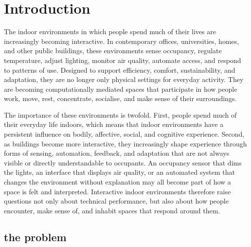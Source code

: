 \chapter{Introduction}\label{ch:introduction}


\openingpara
  {The indoor environments in which people spend much of their lives}
  {are increasingly becoming interactive. In contemporary offices, universities, homes, and other public buildings, these environments sense occupancy, regulate temperature, adjust lighting, monitor air quality, automate access, and respond to patterns of use. Designed to support efficiency, comfort, sustainability, and adaptation, they are no longer only physical settings for everyday activity. They are becoming computationally mediated spaces that participate in how people work, move, rest, concentrate, socialise, and make sense of their surroundings.}

The importance of these environments is twofold. First, people spend much of their everyday life indoors, which means that indoor environments have a persistent influence on bodily, affective, social, and cognitive experience. Second, as buildings become more interactive, they increasingly shape experience through forms of sensing, automation, feedback, and adaptation that are not always visible or directly understandable to occupants. An occupancy sensor that dims the lights, an interface that displays air quality, or an automated system that changes the environment without explanation may all become part of how a space is felt and interpreted. Interactive indoor environments therefore raise questions not only about technical performance, but also about how people encounter, make sense of, and inhabit spaces that respond around them.

\section{the problem}


